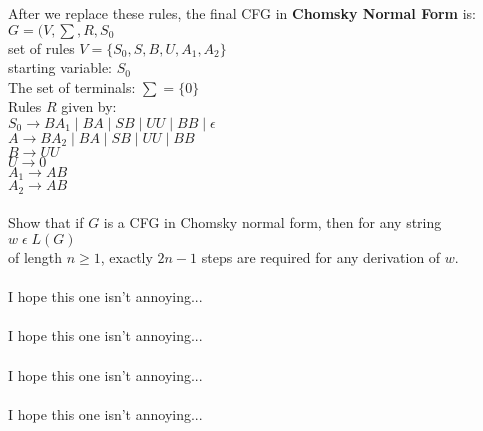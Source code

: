 \documentclass[12pt]{article}
\begin{document}
After we replace these rules, the final CFG in \textbf{Chomsky Normal Form} is: \\
$G = (V, \sum, R, S_0$ \\
set of rules $V = \{S_0, S, B, U, A_1, A_2 \}$ \\
starting variable: $S_0$ \\
The set of terminals: $\sum = \{ 0 \}$ \\
Rules $R$ given by: \\
$S_0 \rightarrow BA_1 \; | \; BA \; | \; SB \; | \; UU \; | \; BB \; | \; \epsilon$ \\
$A \rightarrow BA_2 \; | \; BA \; | \; SB \; | \; UU \; | \; BB $ \\
$B \rightarrow UU $ \\
$U \rightarrow 0$ \\
$A_1 \rightarrow AB$ \\
$A_2 \rightarrow AB$ \\

\pagebreak
{} \\
Show that if $G$ is a CFG in Chomsky normal form, then for any string $w \; \epsilon \; L(G)$ \\
of length $n \geq 1$, exactly $2n - 1$ steps are required 
for any derivation of $w$. \\

\pagebreak
{} \\

I hope this one isn't annoying... \\

 \\

I hope this one isn't annoying... \\

 \\

I hope this one isn't annoying... \\

 \\

I hope this one isn't annoying... \\
\end{document}
